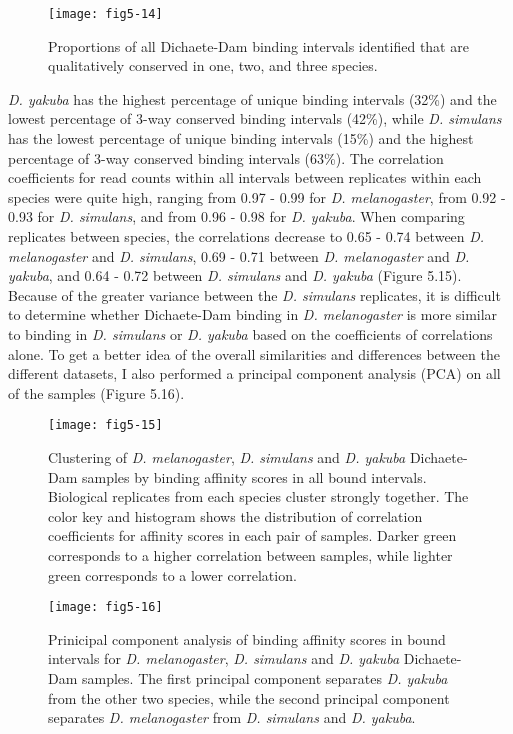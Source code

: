 \begin{figure}
\centering
\texttt{[image: fig5-14]}
\caption{Proportions of all Dichaete-Dam binding intervals identified that are qualitatively conserved in one, two, and three species.}
\label{Figure 5.14}
\end{figure}

\emph{D. yakuba} has the highest percentage of unique binding intervals (32\%) and the lowest percentage of 3-way conserved binding intervals (42\%), while \emph{D. simulans} has the lowest percentage of unique binding intervals (15\%) and the highest percentage of 3-way conserved binding intervals (63\%). The correlation coefficients for read counts within all intervals between replicates within each species were quite high, ranging from 0.97 - 0.99 for \emph{D. melanogaster}, from 0.92 - 0.93 for \emph{D. simulans}, and from 0.96 - 0.98 for \emph{D. yakuba}. When comparing replicates between species, the correlations decrease to 0.65 - 0.74 between \emph{D. melanogaster} and \emph{D. simulans}, 0.69 - 0.71 between \emph{D. melanogaster} and \emph{D. yakuba}, and 0.64 - 0.72 between \emph{D. simulans} and \emph{D. yakuba} (Figure 5.15). Because of the greater variance between the \emph{D. simulans} replicates, it is difficult to determine whether Dichaete-Dam binding in \emph{D. melanogaster} is more similar to binding in \emph{D. simulans} or \emph{D. yakuba} based on the coefficients of correlations alone. To get a better idea of the overall similarities and differences between the different datasets, I also performed a principal component analysis (PCA) on all of the samples (Figure 5.16).

\begin{figure}
\centering
\texttt{[image: fig5-15]}
\caption[Clustering of \emph{D. melanogaster}, \emph{D. simulans} and \emph{D. yakuba} Dichaete-Dam samples by binding affinity scores in all bound intervals]{Clustering of \emph{D. melanogaster}, \emph{D. simulans} and \emph{D. yakuba} Dichaete-Dam samples by binding affinity scores in all bound intervals. Biological replicates from each species cluster strongly together. The color key and histogram shows the distribution of correlation coefficients for affinity scores in each pair of samples. Darker green corresponds to a higher correlation between samples, while lighter green corresponds to a lower correlation.}
\label{Figure 5.15}
\end{figure}

\begin{figure}
\centering
\texttt{[image: fig5-16]}
\caption[Prinicipal component analysis of binding affinity scores in bound intervals for \emph{D. melanogaster}, \emph{D. simulans} and \emph{D. yakuba} Dichaete-Dam samples]{Prinicipal component analysis of binding affinity scores in bound intervals for \emph{D. melanogaster}, \emph{D. simulans} and \emph{D. yakuba} Dichaete-Dam samples. The first principal component separates \emph{D. yakuba} from the other two species, while the second principal component separates \emph{D. melanogaster} from \emph{D. simulans} and \emph{D. yakuba}.}
\label{Figure 5.16}
\end{figure}

